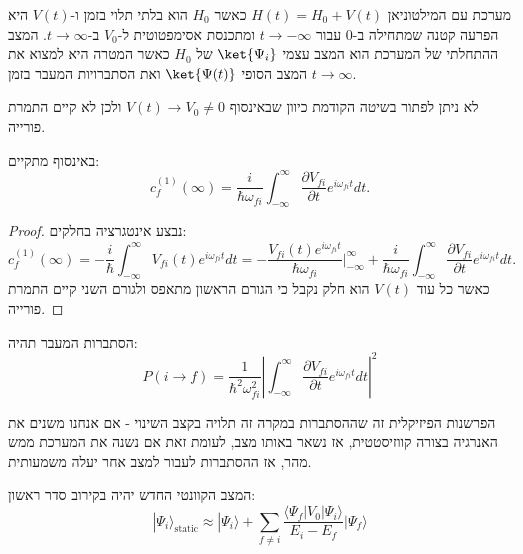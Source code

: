 \documentclass{tstextbook}
\begin{document}
\begin{definition}
מערכת עם המילטוניאן \(H(t)=H_{0}+V(t)\) כאשר \(H_{0}\) הוא בלתי תלוי בזמן ו-\(V(t)\) היא הפרעה קטנה שמתחילה ב-0 עבור \(t\to -\infty\) ומתכנסת אסימפטוטית ל-\(V_{0}\) ב-\(t\to \infty\). המצב ההתחלתי של המערכת הוא המצב עצמי \(\ket{\Psi_{i}}\) של \(H_{0}\) כאשר המטרה היא למצוא את המצב הסופי \(\ket{\Psi(t)}\) ואת הסתברויות המעבר בזמן \(t\to \infty\).

\end{definition}
\begin{remark}
לא ניתן לפתור בשיטה הקודמת כיוון שבאינסוף \(V(t)\to V_{0} \neq 0\) ולכן לא קיים התמרת פורייה.

\end{remark}
\begin{proposition}
באינסוף מתקיים:
$$c_{f}^{(1)}(\infty)=\frac{i}{\hbar\omega_{f i}}\int_{-\infty}^{\infty}\frac{\partial V_{f i}}{\partial t}e^{i\omega_{f i}t}d t.$$

\end{proposition}
\begin{proof}
נבצע אינטגרציה בחלקים:
$$c_{f}^{(1)}(\infty)=-\frac{i}{\hbar}\int_{-\infty}^{\infty}V_{f i}(t)e^{i\omega_{f i}t}d t=-\frac{V_{f i}(t)e^{i\omega_{f i}t}}{\hbar\omega_{f i}}\Big|_{-\infty}^{\infty}+\frac{i}{\hbar\omega_{f i}}\int_{-\infty}^{\infty}\frac{\partial V_{f i}}{\partial t}e^{i\omega_{f i}t}d t.$$
כאשר כל עוד \(V(t)\) הוא חלק נקבל כי הגורם הראשון מתאפס ולגורם השני קיים התמרת פורייה.

\end{proof}
\begin{corollary}
הסתברות המעבר תהיה:
$$P(i\to f)=\frac{1}{\hbar^{2}\omega_{f i}^{2}}\left|\int_{-\infty}^{\infty}\frac{\partial V_{f i}}{\partial t}e^{i\omega_{f i}t}d t\right|^{2}$$

\end{corollary}
\begin{remark}
הפרשנות הפיזיקלית זה שההסתברות במקרה זה תלויה בקצב השינוי - אם אנחנו משנים את האנרגיה בצורה קווזיסטטית, אז נשאר באותו מצב, לעומת זאת אם נשנה את המערכת ממש מהר, אז ההסתברות לעבור למצב אחר יעלה משמעותית.

\end{remark}
\begin{corollary}
המצב הקוונטי החדש יהיה בקירוב סדר ראשון:
$$|\Psi_{i}\rangle_{\mathrm{static}}\approx|\Psi_{i}\rangle+\sum_{f\neq i}{\frac{\langle\Psi_{f}|V_{0}|\Psi_{i}\rangle}{E_{i}-E_{f}}}|\Psi_{f}\rangle$$

\end{corollary}
\end{document}

